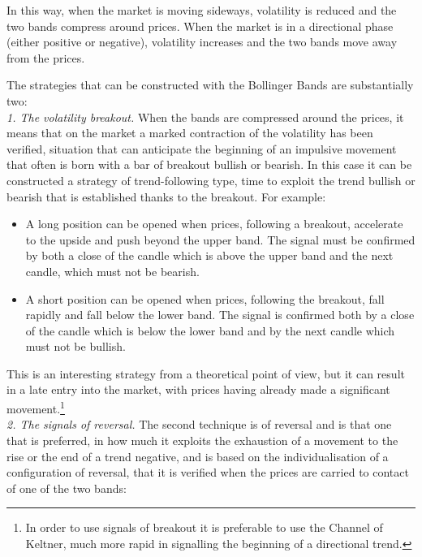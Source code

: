 In this way, when the market is moving sideways, volatility is reduced and the two bands compress around prices. When the market is in a directional phase (either positive or negative), volatility increases and the two bands move away from the prices.

The strategies that can be constructed with the Bollinger Bands are substantially two:\\

\noindent\textit{1. The volatility breakout.} When the bands are compressed around the prices, it means that on the market a marked contraction of the volatility has been verified, situation that can anticipate the beginning of an impulsive movement that often is born with a bar of breakout bullish or bearish. In this case it can be constructed a strategy of trend-following type, time to exploit the trend bullish or bearish that is established thanks to the breakout. For example:

\begin{itemize}
\setlength\itemsep{0.3em}
\item A long position can be opened when prices, following a breakout, accelerate to the upside and push beyond the upper band. The signal must be confirmed by both a close of the candle which is above the upper band and the next candle, which must not be bearish.
\item A short position can be opened when prices, following the breakout, fall rapidly and fall below the lower band. The signal is confirmed both by a close of the candle which is below the lower band and by the next candle which must not be bullish. 
\end{itemize} 

This is an interesting strategy from a theoretical point of view, but it can result in a late entry into the market, with prices having already made a significant movement.\footnote{In order to use signals of breakout it is preferable to use the Channel of Keltner, much more rapid in signalling the beginning of a directional trend.}  \\

\noindent\textit{2. The signals of reversal.} The second technique is of reversal and is that one that is preferred, in how much it exploits the exhaustion of a movement to the rise or the end of a trend negative, and is based on the individualisation of a configuration of reversal, that it is verified when the prices are carried to contact of one of the two bands: 

